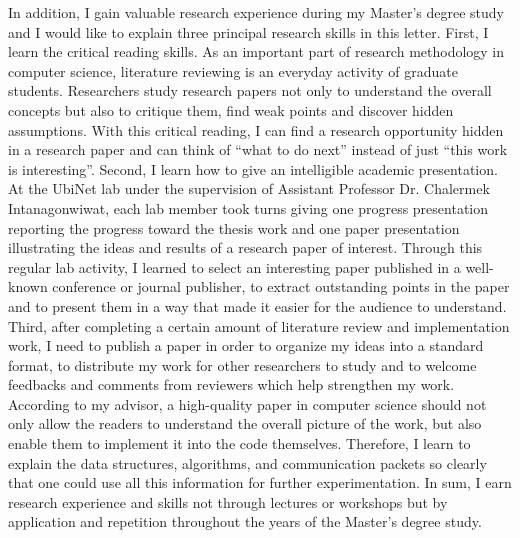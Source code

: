 \documentclass[a4paper,10pt]{report}
\begin{document}
\vspace{0.2cm}
In addition, I gain valuable research experience during my Master's degree study and I would like to explain three principal research skills in this letter. First, I learn the critical reading skills. As an important part of research methodology in computer science, literature reviewing is an everyday activity of graduate students. Researchers study research papers not only to understand the overall concepts but also to critique them, find weak points and discover hidden assumptions. With this critical reading, I can find a research opportunity hidden in a research paper and can think of ``what to do next'' instead of just ``this work is interesting''. Second, I learn how to give an intelligible academic presentation. At the UbiNet lab under the supervision of Assistant Professor Dr. Chalermek Intanagonwiwat, each lab member took turns giving one progress presentation reporting the progress toward the thesis work and one paper presentation illustrating the ideas and results of a research paper of interest. Through this regular lab activity, I learned to select an interesting paper published in a well-known conference or journal publisher, to extract outstanding points in the paper and to present them in a way that made it easier for the audience to understand. Third, after completing a certain amount of literature review and implementation work, I need to publish a paper in order to organize my ideas into a standard format, to distribute my work for other researchers to study and to welcome feedbacks and comments from reviewers which help strengthen my work. According to my advisor, a high-quality paper in computer science should not only allow the readers to understand the overall picture of the work, but also enable them to implement it into the code themselves. Therefore, I learn to explain the data structures, algorithms, and communication packets so clearly that one could use all this information for further experimentation. In sum, I earn research experience and skills not through lectures or workshops but by application and repetition throughout the years of the Master's degree study.
\end{document}
